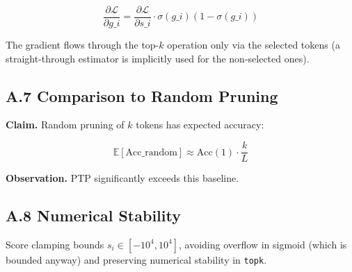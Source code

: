 \[
\frac{\partial \mathcal{L}}{\partial g\_i} = \frac{\partial \mathcal{L}}{\partial s\_i} \cdot \sigma(g\_i)(1 - \sigma(g\_i))
\tag{A.4}
\]

The gradient flows through the top-$k$ operation only via the selected 
tokens (a straight-through estimator is implicitly used for the 
non-selected ones).

\subsection{A.7 Comparison to Random Pruning}

\textbf{Claim.} Random pruning of $k$ tokens has expected accuracy:

\[
\mathbb{E}[\text{Acc}\_\text{random}] \approx \text{Acc}(1) \cdot \frac{k}{L}
\tag{A.5}
\]

\textbf{Observation.} PTP significantly exceeds this baseline.

\subsection{A.8 Numerical Stability}

Score clamping bounds $s_i \in [-10^4, 10^4]$, avoiding overflow in 
sigmoid (which is bounded anyway) and preserving numerical stability 
in \texttt{topk}.

